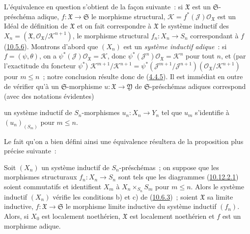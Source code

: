 L'équivalence en question s'obtient de la façon suivante~: si
$\mathfrak{X}$ est un $\mathfrak{S}$-préschéma adique,
$f:\mathfrak{X}\to\mathfrak{S}$ le morphisme structural,
$\mathscr{K}=f^*(\mathscr{J})\mathscr{O}_{\mathfrak{X}}$ est un Idéal de
définition de $\mathfrak{X}$ et on fait correspondre à $\mathfrak{X}$ le
système inductif des
$X_n=(\mathfrak{X},\mathscr{O}_{\mathfrak{X}}/\mathscr{K}^{n+1})$, le
morphisme structural $f_n:X_n\to S_n$ correspondant à $f$
(\hyperref[I.10.5.6-fr]{10.5.6}). Montrons d'abord que $(X_n)$ est un
\emph{système inductif adique}~: si $f=(\psi,\theta)$, on a
$\psi^*(\mathscr{J})\mathscr{O}_{\mathfrak{X}}=\mathscr{K}$, donc
$\psi^*(\mathscr{J}^n)\mathscr{O}_{\mathfrak{X}}=\mathscr{K}^n$ pour tout
$n$, et (par l'exactitude du foncteur $\psi^*$)
$\mathscr{K}^{m+1}/\mathscr{K}^{n+1}
=\psi^*(\mathscr{J}^{m+1}/\mathscr{J}^{n+1})
(\mathscr{O}_{\mathfrak{X}}/\mathscr{K}^{n+1})$ pour $m\leq n$~; notre
conclusion résulte donc de (\hyperref[I.4.4.5-fr]{4.4.5}). Il est immédiat
en outre de vérifier qu'à un $\mathfrak{S}$-morphisme
$u:\mathfrak{X}\to\mathfrak{Y}$ de $\mathfrak{S}$-préschémas adiques
correspond (avec des notations évidentes)


un système inductif de $S_n$-morphismes $u_n:X_n\to Y_n$ tel que $u_m$
s'identifie à $(u_n)_{(S_m)}$ pour $m\leq n$.

Le fait qu'on a bien défini ainsi une équivalence résultera de la proposition
plus précise suivante~:

\begin{proposition}[10.12.3.1]
\label{I.10.12.3.1-fr}
Soit $(X_n)$ un système inductif de $S_n$-préschémas~; on suppose que les
morphismes structuraux $f_n:X_n\to S_n$ sont tels que les diagrammes
\textup{(\hyperref[I.10.12.2.1-fr]{10.12.2.1})} soient commutatifs et identifient
$X_m$ à $X_n\times_{S_n}S_m$ pour $m\leq n$. Alors le système inductif
$(X_n)$ vérifie les conditions \textup{b)} et \textup{c)} de
\textup{(\hyperref[I.10.6.3-fr]{10.6.3})}~; soient $\mathfrak{X}$ sa limite inductive,
$f:\mathfrak{X}\to\mathfrak{S}$ le morphisme limite inductive du système
inductif $(f_n)$. Alors, si $X_0$ est localement noethérien,
$\mathfrak{X}$ est localement noethérien et $f$ est un morphisme adique.
\end{proposition}

